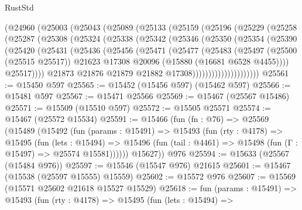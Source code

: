\begin{lexlean}{RustStd}
\begin{coremodule}
      (@24960
        (@25003
          (@25043
            (@25089
              (@25133
                (@25159
                  (@25196
                    (@25229
                      (@25258
                        (@25287
                          (@25308
                            (@25324
                              (@25338
                                (@25342
                                  (@25346
                                    (@25350
                                      (@25354
                                        (@25390
                                          (@25420
                                            (@25431
                                              (@25436
                                                (@25456
                                                  (@25471
                                                    (@25477
                                                      (@25483
                                                        (@25497
                                                          (@25500 (@25515 @25517))
                                                          @21623
                                                          @17308
                                                          @20096
                                                          (@15880 (@16681 @6528 @4455))))
                                                      @25517))))
                                              @21873
                                              @21876
                                              @21879
                                              @21882
                                              @17308)))))))))))))))))))))
@25561 := @15450 @597
@25565 := @15452 (@15456 @597) (@15462 @597)
@25566 := @15481 @597
@25567 := @15471 @25566
@25569 := @15467 (@25567 @15486)
@25571 := @15509 (@15510 @597)
@25572 := @15505 @25571
@25574 := @15467 (@25572 @15534)
@25591 := @15466
    (fun (fn : @76) =>
    @25569
      (@15489
        (@15492
          (fun (params : @15491) =>
          @15493
            (fun (rty : @4178) =>
            @15495
              (fun (lets : @15494) =>
              @15496 (fun (tail : @4461) => @15498 (fun (Γ : @15497) => @25574 @15581))))))
        @15627))
    @976
@25594 := @15633 (@25567 (@15484 @976))
@25597 := @15546 (@15547 @976) @21615
@25601 := @15467 (@15538 (@25597 @15555) @15559)
@25602 := @15572 @976
@25607 := @15569 (@15571 @25602 @21618 @15527 @15529)
@25618 := fun (params : @15491) =>
  @15493
    (fun (rty : @4178) =>
    @15495
      (fun (lets : @15494) =>

\end{coremodule}
\end{lexlean}
